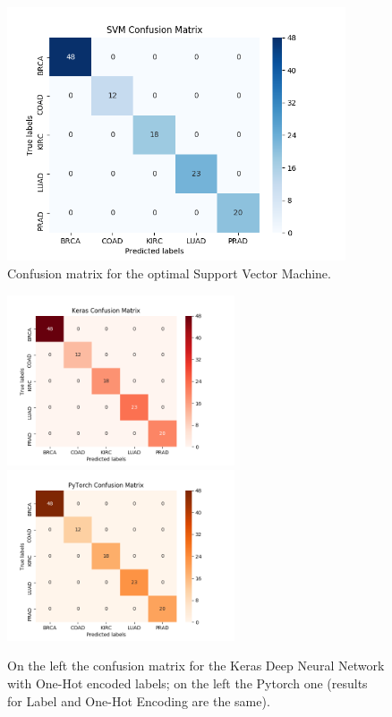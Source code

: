 \documentclass[12pt]{article}
\begin{document}
\begin{itemize}
\begin{figure}[h!]
\centering
\includegraphics[width=100mm]{img/svm.png}
\caption{Confusion matrix for the optimal Support Vector Machine.}
\label{fig_svm}
\end{figure}

\begin{figure}
\centering
\advance\leftskip-4cm
\advance\rightskip-4cm
\includegraphics[width=0.60\textwidth]{img/keras.png}
\includegraphics[width=0.60\textwidth]{img/pytorch.png} %
\caption{On the left the confusion matrix for the Keras Deep Neural Network with One-Hot encoded labels; on the left the Pytorch one (results for Label and One-Hot Encoding are the same).}
\label{fig_deep}
\end{figure}


\end{itemize}
\end{document}
